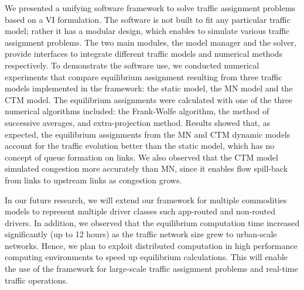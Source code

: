 We presented a unifying software framework to solve traffic assignment problems based on a VI formulation. The software is not built to fit any particular traffic model; rather it has a modular design, which enables to simulate various traffic assignment problems. The two main modules, the model manager and the solver, provide interfaces to integrate different traffic models and numerical methods respectively. To demonstrate the software use, we conducted numerical experiments that compare equilibrium assignment resulting from three traffic models implemented in the framework: the static model, the MN model and the CTM model. The equilibrium assignments were calculated with one of the three numerical algorithms included: the Frank-Wolfe algorithm, the method of successive averages, and extra-projection method. Results showed that, as expected, the equilibrium assignments from the MN and CTM dynamic models account for the traffic evolution better than the static model, which has no concept of queue formation on links. We also observed that the CTM model simulated congestion more accurately than MN, since it enables flow spill-back from links to upstream links as congestion grows.

In our future research, we will extend our framework for multiple commodities models to represent multiple driver classes such app-routed and non-routed drivers. In addition, we observed that the equilibrium computation time increased significantly (up to 12 hours) as the traffic network size grew to urban-scale networks. Hence, we plan to exploit distributed computation in high performance computing environments to speed up equilibrium calculations. This will enable the use of the framework for large-scale traffic assignment problems and real-time traffic operations. 

